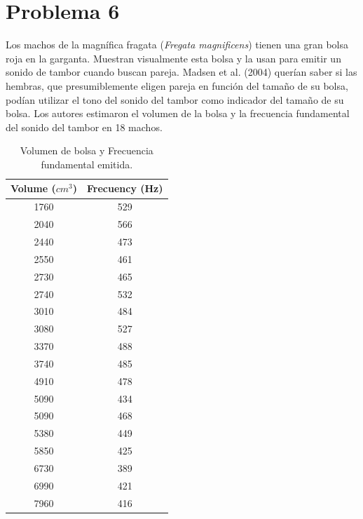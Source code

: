 \documentclass[a4paper,12pt]{article}
\begin{document}
\section*{Problema 6}
Los machos de la magnífica fragata (\textit{Fregata magnificens}) tienen una gran bolsa roja en la garganta. Muestran visualmente esta bolsa y la usan para emitir un sonido de tambor cuando buscan pareja. Madsen et al. (2004) querían saber si las hembras, que presumiblemente eligen pareja en función del tamaño de su bolsa, podían utilizar el tono del sonido del tambor como indicador del tamaño de su bolsa. Los autores estimaron el volumen de la bolsa y la frecuencia fundamental del sonido del tambor en 18 machos.
\begin{center}
	\begin{table}[H]
		\centering
		\caption{Volumen de bolsa y Frecuencia fundamental emitida.}
		\begin{tabular}{cc}
			\toprule[1.5 pt]
			Volume ($cm^3$) & Frecuency (Hz) \\
			\midrule
			1760&529\\
			2040&566\\
			2440&473\\
			2550&461\\
			2730&465\\
			2740&532\\
			3010&484\\
			3080&527\\
			3370&488\\
			3740&485\\
			4910&478\\
			5090&434\\
			5090&468\\
			5380&449\\
			5850&425\\
			6730&389\\
			6990&421\\
			7960&416\\
			\bottomrule[1.5pt]
		\end{tabular}
		\label{tab:my_label6}
	\end{table}
\end{center}
\end{document}
